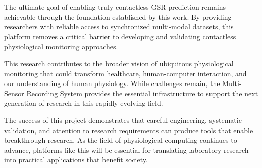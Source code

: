 The ultimate goal of enabling truly contactless GSR prediction remains achievable through the foundation established by this work. By providing researchers with reliable access to synchronized multi-modal datasets, this platform removes a critical barrier to developing and validating contactless physiological monitoring approaches.

This research contributes to the broader vision of ubiquitous physiological monitoring that could transform healthcare, human-computer interaction, and our understanding of human physiology. While challenges remain, the Multi-Sensor Recording System provides the essential infrastructure to support the next generation of research in this rapidly evolving field.

The success of this project demonstrates that careful engineering, systematic validation, and attention to research requirements can produce tools that enable breakthrough research. As the field of physiological computing continues to advance, platforms like this will be essential for translating laboratory research into practical applications that benefit society.
